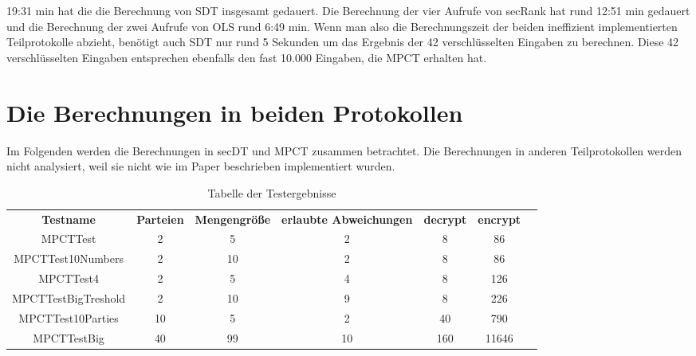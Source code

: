 19:31 min hat die die Berechnung von SDT insgesamt gedauert. Die Berechnung der vier Aufrufe von secRank hat rund 12:51 min gedauert und die Berechnung der zwei Aufrufe von OLS rund 6:49 min. Wenn man also die Berechnungszeit der beiden ineffizient implementierten Teilprotokolle abzieht, benötigt auch SDT nur rund 5 Sekunden um das Ergebnis der 42 verschlüsselten Eingaben zu berechnen. Diese 42 verschlüsselten Eingaben entsprechen ebenfalls den fast 10.000 Eingaben, die MPCT erhalten hat.


\section{Die Berechnungen in beiden Protokollen}
Im Folgenden werden die Berechnungen in secDT und MPCT zusammen betrachtet.
Die Berechnungen in anderen Teilprotokollen werden nicht analysiert, weil sie nicht wie im Paper \cite{Doettling2021} beschrieben implementiert wurden.

   \begin{table}[!h]
     \centering
     \begin{tabular}{ccccccc}
       \textbf{Testname} & \textbf{Parteien} & \textbf{Mengengröße} & \textbf{erlaubte Abweichungen} & \textbf{decrypt} &\textbf{encrypt}\\
       MPCTTest & 2 & 5 & 2 & 8 & 86\\
       MPCTTest10Numbers & 2 & 10 & 2 & 8 & 86\\
       MPCTTest4 & 2 & 5 & 4 & 8 & 126\\
       MPCTTestBigTreshold & 2 & 10 & 9 & 8 & 226\\
       MPCTTest10Parties & 10 & 5 & 2 & 40 & 790\\
       MPCTTestBig &40 & 99 & 10 & 160 & 11646\\
     \end{tabular}

     \caption{Tabelle der Testergebnisse}
     \label{tbl:results}

   \end{table}
   
